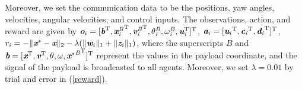 \documentclass[letterpaper, 10 pt, conference]{ieeeconf} %
\begin{document}
Moreover, we set the communication data to be the positions, yaw angles, velocities, angular velocities, and control inputs.
The observations, action, and reward are given by $\textit{\textbf{o}}_i=[\textit{\textbf{b}}^{\rm{T}}\it{}, {\textit{\textbf{x}}_i^B}^{\rm{T}}, {\textit{\textbf{v}}_i^B}^{\rm{T}}, \theta_i^B, \omega_i^B, {\textit{\textbf{u}}_i^{\rm{T}}\it{}}]^{\rm{T}}$, $\textit{\textbf{a}}_i=[{\textit{\textbf{u}}_i}^{\rm{T}}\it{},{\textit{\textbf{c}}_i}^{\rm{T}}\it{},{{\textit{\textbf{d}}_i}}^{\rm{T}} ]^{\rm{T}}$, $r_i=-\| \textit{\textbf{x}}^{\ast}-\textit{\textbf{x}}\|_2-\lambda (\| \textit{\textbf{w}}_i \|_1+\| \textit{\textbf{z}}_i \|_1)$, 
where the superscripts $B$ and $\textit{\textbf{b}}=[\textit{\textbf{x}}^{\rm{T}}\it{}, \textit{\textbf{v}}^{\rm{T}}\it{}, \theta, \omega, {{\textit{\textbf{x}}^{\ast}}^B}^{\rm{T}}\it{}]^{\rm{T}}$ represent the values in the payload coordinate, and the signal of the payload is broadcasted to all agents.
Moreover, we set $\lambda=0.01$ by trial and error in (\ref{reward}).

\end{document}
